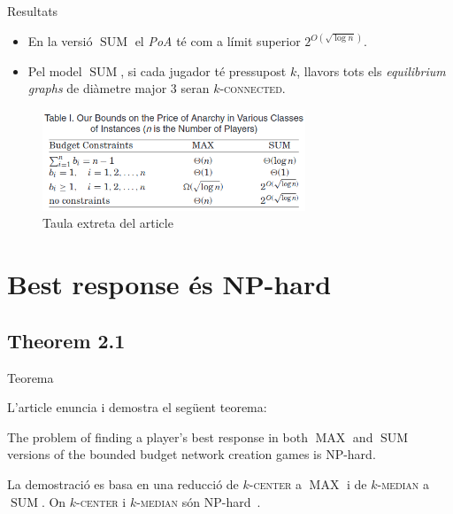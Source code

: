 \documentclass[aspectratio=169,handout]{beamer}
\DeclareMathOperator{\SUM}{SUM}
\DeclareMathOperator{\MAX}{MAX}
\newcommand{\kcenter}{\texorpdfstring{$k$}{k}-\textsc{center}\xspace}
\newcommand{\kmedian}{\texorpdfstring{$k$}{k}-\textsc{median}\xspace}
\begin{document}
\begin{frame}{Resultats}
\begin{itemize}[<+->] 
    
    \item En la versió $\SUM$ el \emph{PoA} té com a límit superior $2^{O(\sqrt{\log n})}$.

    \vspace{1em}
    
    \item Pel model $\SUM$, si cada jugador té pressupost $k$, llavors tots els \emph{equilibrium graphs} de diàmetre major $3$ seran $k$-\textsc{connected}.
    
\end{itemize} 

    \begin{figure}
    \centering
    \includegraphics[width=0.7\textwidth]{Table1_PoA_Bounds}
    \caption{Taula extreta del article \cite{ehsani_bounded_2015}}
    \end{figure}
\end{frame}

\section{Best response és NP-hard}
\subsection{Theorem 2.1}
\begin{frame}{Teorema}

    L'article enuncia i demostra el següent teorema:
    
    \begin{theorem}
    The problem of finding a player's best response in both $\MAX$ and $\SUM$ versions of the bounded
    budget network creation games is NP-hard.
    \end{theorem}
    
    \vspace{2em}
    
    La demostració es basa en una reducció de \kcenter a $\MAX$ i de \kmedian a $\SUM$.
    On \kcenter i \kmedian són 
    NP-hard~\cite{hsu_easy_1979,lin_e-approximations_1992,megiddo_complexity_1984}.
    
\end{frame}
\end{document}
